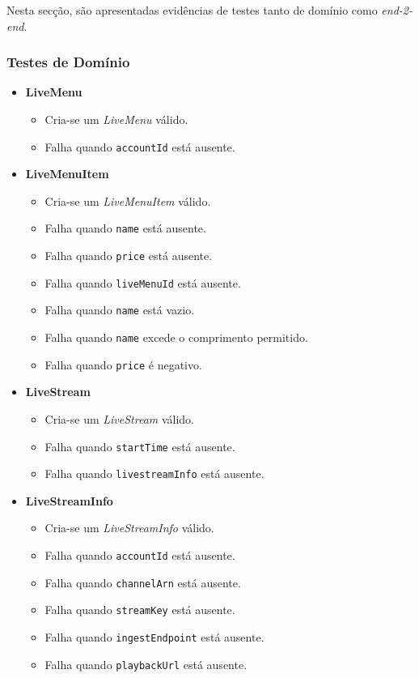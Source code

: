 Nesta secção, são apresentadas evidências de testes tanto de domínio como \textit{end-2-end}.

\subsubsection{Testes de Domínio}

\begin{itemize}
  \item \textbf{LiveMenu}
    \begin{itemize}
      \item Cria-se um \textit{LiveMenu} válido.
      \item Falha quando \texttt{accountId} está ausente.
    \end{itemize}

  \item \textbf{LiveMenuItem}
    \begin{itemize}
      \item Cria-se um \textit{LiveMenuItem} válido.
      \item Falha quando \texttt{name} está ausente.
      \item Falha quando \texttt{price} está ausente.
      \item Falha quando \texttt{liveMenuId} está ausente.
      \item Falha quando \texttt{name} está vazio.
      \item Falha quando \texttt{name} excede o comprimento permitido.
      \item Falha quando \texttt{price} é negativo.
    \end{itemize}

  \item \textbf{LiveStream}
    \begin{itemize}
      \item Cria-se um \textit{LiveStream} válido.
      \item Falha quando \texttt{startTime} está ausente.
      \item Falha quando \texttt{livestreamInfo} está ausente.
    \end{itemize}

  \item \textbf{LiveStreamInfo}
    \begin{itemize}
      \item Cria-se um \textit{LiveStreamInfo} válido.
      \item Falha quando \texttt{accountId} está ausente.
      \item Falha quando \texttt{channelArn} está ausente.
      \item Falha quando \texttt{streamKey} está ausente.
      \item Falha quando \texttt{ingestEndpoint} está ausente.
      \item Falha quando \texttt{playbackUrl} está ausente.
    \end{itemize}


\end{itemize}
